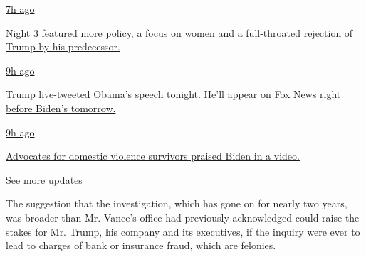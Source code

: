 \href{https://www.nytimes3xbfgragh.onion/live/2020/08/19/us/dnc-convention-election?action=click\&pgtype=Article\&state=default\&region=MAIN_CONTENT_1\&context=storylines_live_updates\#night-3-featured-more-policy-a-focus-on-women-and-a-full-throated-rejection-of-trump-by-his-predecessor}{7h
ago}

\href{https://www.nytimes3xbfgragh.onion/live/2020/08/19/us/dnc-convention-election?action=click\&pgtype=Article\&state=default\&region=MAIN_CONTENT_1\&context=storylines_live_updates\#night-3-featured-more-policy-a-focus-on-women-and-a-full-throated-rejection-of-trump-by-his-predecessor}{Night
3 featured more policy, a focus on women and a full-throated rejection
of Trump by his predecessor.}

\href{https://www.nytimes3xbfgragh.onion/live/2020/08/19/us/dnc-convention-election?action=click\&pgtype=Article\&state=default\&region=MAIN_CONTENT_1\&context=storylines_live_updates\#trump-live-tweeted-obamas-speech-tonight-hell-appear-on-fox-news-right-before-bidens-tomorrow}{9h
ago}

\href{https://www.nytimes3xbfgragh.onion/live/2020/08/19/us/dnc-convention-election?action=click\&pgtype=Article\&state=default\&region=MAIN_CONTENT_1\&context=storylines_live_updates\#trump-live-tweeted-obamas-speech-tonight-hell-appear-on-fox-news-right-before-bidens-tomorrow}{Trump
live-tweeted Obama's speech tonight. He'll appear on Fox News right
before Biden's tomorrow.}

\href{https://www.nytimes3xbfgragh.onion/live/2020/08/19/us/dnc-convention-election?action=click\&pgtype=Article\&state=default\&region=MAIN_CONTENT_1\&context=storylines_live_updates\#advocates-for-domestic-violence-survivors-praised-biden-in-a-video}{9h
ago}

\href{https://www.nytimes3xbfgragh.onion/live/2020/08/19/us/dnc-convention-election?action=click\&pgtype=Article\&state=default\&region=MAIN_CONTENT_1\&context=storylines_live_updates\#advocates-for-domestic-violence-survivors-praised-biden-in-a-video}{Advocates
for domestic violence survivors praised Biden in a video.}

\href{https://www.nytimes3xbfgragh.onion/live/2020/08/19/us/dnc-convention-election?action=click\&pgtype=Article\&state=default\&region=MAIN_CONTENT_1\&context=storylines_live_updates}{See
more updates}

The suggestion that the investigation, which has gone on for nearly two
years, was broader than Mr. Vance's office had previously acknowledged
could raise the stakes for Mr. Trump, his company and its executives, if
the inquiry were ever to lead to charges of bank or insurance fraud,
which are felonies.

